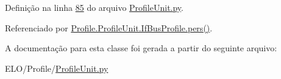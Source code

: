 Definição na linha \hyperlink{ProfileUnit_8py_source_l00085}{85} do arquivo \hyperlink{ProfileUnit_8py_source}{Profile\-Unit.\-py}.



Referenciado por \hyperlink{classProfile_1_1ProfileUnit_1_1IfBusProfile_a996592f4b01e0540f45d042065d5a7f4}{Profile.\-Profile\-Unit.\-If\-Bus\-Profile.\-pers()}.



A documentação para esta classe foi gerada a partir do seguinte arquivo\-:\begin{DoxyCompactItemize}
\item 
E\-L\-O/\-Profile/\hyperlink{ProfileUnit_8py}{Profile\-Unit.\-py}\end{DoxyCompactItemize}

